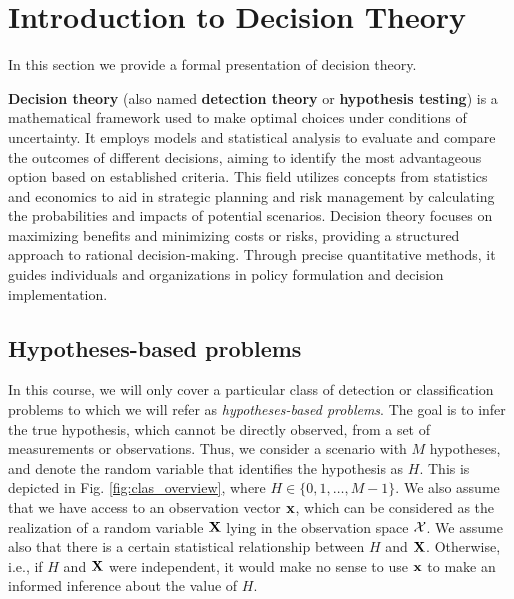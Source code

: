 \section{Introduction to Decision Theory}
\label{sec:SDT}

In this section we provide a formal presentation of decision theory. 

\textbf{Decision theory} (also named \textbf{detection theory} or \textbf{hypothesis testing}) is a mathematical framework used to make optimal choices under conditions of uncertainty. It employs models and statistical analysis to evaluate and compare the outcomes of different decisions, aiming to identify the most advantageous option based on established criteria. This field utilizes concepts from statistics and economics to aid in strategic planning and risk management by calculating the probabilities and impacts of potential scenarios. Decision theory focuses on maximizing benefits and minimizing costs or risks, providing a structured approach to rational decision-making. Through precise quantitative methods, it guides individuals and organizations in policy formulation and decision implementation.
 

\subsection{Hypotheses-based problems}
\label{subsec:hypotheses_problems}

In this course, we will only cover a particular class of detection or classification problems to which we will refer as {\em hypotheses-based problems}. The goal is to infer the true hypothesis, which cannot be directly observed, from a set of measurements or observations.  Thus, we consider a scenario with $M$ hypotheses, and denote the random variable that identifies the hypothesis as $H$. This is depicted in Fig. \ref{fig:clas_overview}, where $H \in \{0, 1, \ldots, M-1\}$. We also assume that we have access to an observation vector $\bf x$, which can be considered as the realization of a random variable $\bf X$ lying in the observation space $\cal X$. We assume also that there is a certain statistical relationship between $H$ and $\bf X$. Otherwise, i.e., if $H$ and $\bf X$ were independent, it would make no sense to use $\bf x$ to make an informed inference about the value of $H$.

